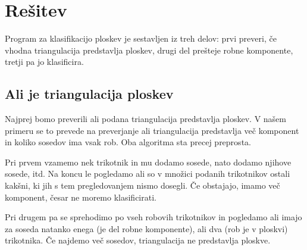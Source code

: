 \documentclass{article}
\begin{document}
\section{Rešitev}
Program za klasifikacijo ploskev je sestavljen iz treh delov: prvi preveri, če vhodna triangulacija predstavlja ploskev, drugi del prešteje robne komponente, tretji pa jo klasificira.
\subsection{Ali je triangulacija ploskev}
Najprej bomo preverili ali podana triangulacija predstavlja ploskev. V našem primeru se to prevede na preverjanje ali triangulacija predstavlja več komponent in koliko sosedov ima vsak rob. Oba algoritma sta precej preprosta. 

Pri prvem vzamemo nek trikotnik in mu dodamo sosede, nato dodamo njihove sosede, itd. Na koncu le pogledamo ali so v množici podanih trikotnikov ostali kakšni, ki jih s tem pregledovanjem nismo dosegli. Če obstajajo, imamo več komponent, česar ne moremo klasificirati.

Pri drugem pa se sprehodimo po vseh robovih trikotnikov in pogledamo ali imajo za soseda natanko enega (je del robne komponente), ali dva (rob je v ploskvi) trikotnika. Če najdemo več sosedov, triangulacija ne predstavlja ploskve.
\end{document}
